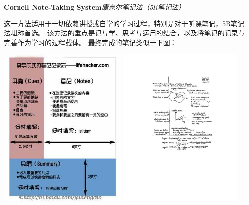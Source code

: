 \begin{shaded}
	{\bf\Large Cornell Note-Taking System}\hfill{\it 康奈尔笔记法（5R笔记法）}
	
	\bigskip
	
	这一方法适用于一切依赖讲授或自学的学习过程，特别是对于听课笔记，5R笔记法堪称首选。
	该方法的重点是记与学、思考与运用的结合，以及将笔记的记录与完善作为学习的过程载体。
	最终完成的笔记类似于下图：
	
	
	\begin{center}
		\includegraphics[height=8cm]{./images/00/Cornell-NTS/NTS-CH.jpg}\quad
		\includegraphics[height=8cm]{./images/00/Cornell-NTS/exCNTS.pdf}
	\end{center}
	

\end{shaded}
